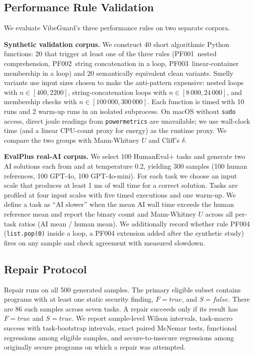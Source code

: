 \documentclass[sigconf,nonacm]{acmart}
\begin{document}
\subsection{Performance Rule Validation}
\label{sec:perf-method}

We evaluate VibeGuard's three performance rules on two separate corpora.

\textbf{Synthetic validation corpus.} We construct 40 short algorithmic
Python functions: 20 that trigger at least one of the three rules
(PF001~nested comprehension, PF002~string concatenation in a loop,
PF003~linear-container membership in a loop) and 20 semantically equivalent
clean variants. Smelly variants use input sizes chosen to make the anti-pattern
expensive: nested loops with $n\in[400,2200]$, string-concatenation loops with
$n\in[8\,000,24\,000]$, and membership checks with $n\in[100\,000,300\,000]$.
Each function is timed with 10 runs and 2 warm-up runs in an isolated
subprocess. On macOS without \texttt{sudo} access, direct joule readings from
\texttt{powermetrics} are unavailable; we use wall-clock time (and a linear
CPU-count proxy for energy) as the runtime proxy. We compare the two groups
with Mann-Whitney $U$ and Cliff's $\delta$.

\textbf{EvalPlus real-AI corpus.} We select 100 HumanEval+ tasks and generate
two AI solutions each from  and
 at temperature 0.2, yielding 300 samples (100
human references, 100 GPT-4o, 100 GPT-4o-mini). For each task we choose an
input scale that produces at least 1 ms of wall time for a correct solution.
Tasks are profiled at four input scales with five timed executions and one
warm-up. We define a task as ``AI slower'' when the mean AI wall time exceeds
the human reference mean and report the binary count and Mann-Whitney $U$
across all per-task ratios (AI mean / human mean). We additionally record
whether rule PF004 (\texttt{list.pop(0)} inside a loop, a PF004 extension
added after the synthetic study) fires on any sample and check agreement with
measured slowdown.

\subsection{Repair Protocol}

Repair runs on all 500 generated samples. The primary eligible subset contains
programs with at least one static security finding, $F=true$, and $S=false$.
There are 86 such samples across seven tasks. A repair succeeds only if its
result has $F=true$ and $S=true$. We report sample-level Wilson intervals,
task-macro success with task-bootstrap intervals, exact paired McNemar tests,
functional regressions among eligible samples, and secure-to-insecure
regressions among originally secure programs on which a repair was attempted.
\end{document}
